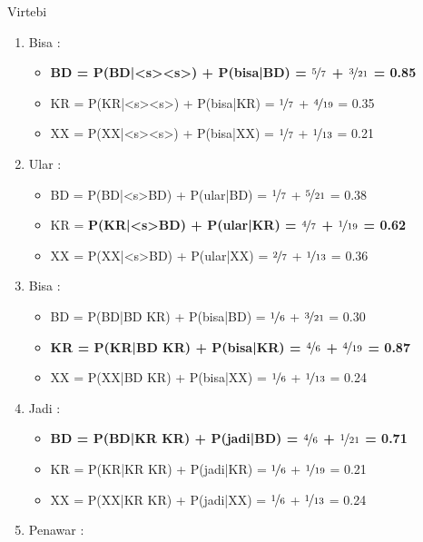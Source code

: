 \documentclass[paper=a4, fontsize=11pt]{scrartcl} %
\numberwithin{equation}{section} %
\numberwithin{figure}{section} %
\numberwithin{table}{section} %
\begin{document}
Virtebi
\begin{enumerate}
	\item Bisa :
	\begin{itemize}
		\item \textbf{BD = P(BD|<s><s>) + P(bisa|BD) = $\nicefrac{5}{7}$ + $\nicefrac{3}{21}$ = 0.85}				
		\item KR = P(KR|<s><s>) + P(bisa|KR) = $\nicefrac{1}{7}$ + $\nicefrac{4}{19}$ = 0.35
		\item XX = P(XX|<s><s>) + P(bisa|XX) = $\nicefrac{1}{7}$ + $\nicefrac{1}{13}$ = 0.21				
	\end{itemize}
	\item Ular :
	\begin{itemize}
		\item BD = P(BD|<s>BD) + P(ular|BD) = $\nicefrac{1}{7}$ + $\nicefrac{5}{21}$ = 0.38
		\item KR = \textbf{P(KR|<s>BD) + P(ular|KR) = $\nicefrac{4}{7}$ + $\nicefrac{1}{19}$ = 0.62}
		\item XX = P(XX|<s>BD) + P(ular|XX) = $\nicefrac{2}{7}$ + $\nicefrac{1}{13}$ = 0.36	
	\end{itemize}
	\item Bisa :
	\begin{itemize}
		\item BD = P(BD|BD KR) + P(bisa|BD) = $\nicefrac{1}{6}$ + $\nicefrac{3}{21}$ = 0.30
		\item \textbf{KR = P(KR|BD KR) + P(bisa|KR) = $\nicefrac{4}{6}$ + $\nicefrac{4}{19}$ = 0.87}
		\item XX = P(XX|BD KR) + P(bisa|XX) = $\nicefrac{1}{6}$ + $\nicefrac{1}{13}$ = 0.24				
	\end{itemize}
	\item Jadi : 
	\begin{itemize}
		\item \textbf{BD = P(BD|KR KR) + P(jadi|BD) = $\nicefrac{4}{6}$ + $\nicefrac{1}{21}$ = 0.71}
		\item KR = P(KR|KR KR) + P(jadi|KR) = $\nicefrac{1}{6}$ + $\nicefrac{1}{19}$ = 0.21
		\item XX = P(XX|KR KR) + P(jadi|XX) = $\nicefrac{1}{6}$ + $\nicefrac{1}{13}$ = 0.24
	\end{itemize}
	\item Penawar : 
\end{enumerate}
\end{document}
